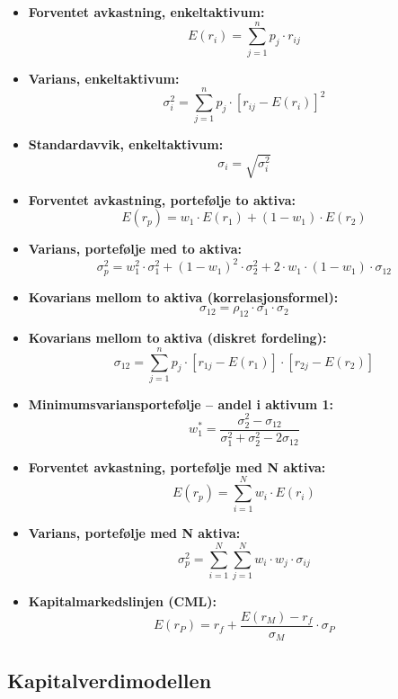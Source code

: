 \documentclass[
  11pt,
  a4paper,
]{article}
\begin{document}
\begin{itemize}
\item
  \textbf{Forventet avkastning, enkeltaktivum:}\\
  \[
  E(r_i) = \sum_{j = 1}^{n} p_j \cdot r_{ij}
  \]
\item
  \textbf{Varians, enkeltaktivum:}\\
  \[
  \sigma_i^2 = \sum_{j = 1}^{n} p_j \cdot \left[ r_{ij} - E(r_i) \right]^2
  \]
\item
  \textbf{Standardavvik, enkeltaktivum:}\\
  \[
  \sigma_i = \sqrt{\sigma_i^2}
  \]
\item
  \textbf{Forventet avkastning, portefølje to aktiva:}\\
  \[
  E(r_p) = w_1 \cdot E(r_1) + (1 - w_1) \cdot E(r_2)
  \]
\item
  \textbf{Varians, portefølje med to aktiva:}\\
  \[
  \sigma_p^2 = w_1^2 \cdot \sigma_1^2 + (1 - w_1)^2 \cdot \sigma_2^2 + 2 \cdot w_1 \cdot (1 - w_1) \cdot \sigma_{12}
  \]
\item
  \textbf{Kovarians mellom to aktiva (korrelasjonsformel):}\\
  \[
  \sigma_{12} = \rho_{12} \cdot \sigma_1 \cdot \sigma_2
  \]
\item
  \textbf{Kovarians mellom to aktiva (diskret fordeling):}\\
  \[
  \sigma_{12} = \sum_{j = 1}^{n} p_j \cdot \left[ r_{1j} - E(r_1) \right] \cdot \left[ r_{2j} - E(r_2) \right]
  \]
\item
  \textbf{Minimumsvariansportefølje -- andel i aktivum 1:}\\
  \[
  w_1^* = \frac{\sigma_2^2 - \sigma_{12}}{\sigma_1^2 + \sigma_2^2 - 2\sigma_{12}}
  \]
\item
  \textbf{Forventet avkastning, portefølje med N aktiva:}\\
  \[
  E(r_p) = \sum_{i = 1}^{N} w_i \cdot E(r_i)
  \]
\item
  \textbf{Varians, portefølje med N aktiva:}\\
  \[
  \sigma_p^2 = \sum_{i = 1}^{N} \sum_{j = 1}^{N} w_i \cdot w_j \cdot \sigma_{ij}
  \]
\item
  \textbf{Kapitalmarkedslinjen (CML):}\\
  \[
  E(r_P) = r_f + \frac{E(r_M) - r_f}{\sigma_M} \cdot \sigma_P
  \]
\end{itemize}

\subsection{Kapitalverdimodellen}\label{kapitalverdimodellen}
\end{document}
